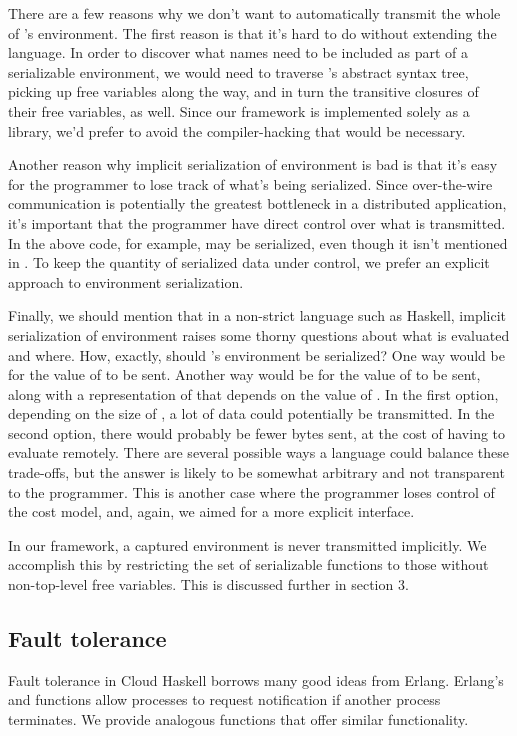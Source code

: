 \documentclass[preprint]{sigplanconf}
\begin{document}
There are a few reasons why we don't want to automatically transmit the whole of 's environment. The first reason is that it's hard to do without extending the language. In order to discover what names need to be included as part of a serializable environment, we would need to traverse 's abstract syntax tree, picking up free variables along the way, and in turn the transitive closures of their free variables, as well. Since our framework is implemented solely as a library, we'd prefer to avoid the compiler-hacking that would be necessary.

Another reason why implicit serialization of environment is bad is that it's easy for the programmer to lose track of what's being serialized. Since over-the-wire communication is potentially the greatest bottleneck in a distributed application, it's important that the programmer have direct control over what is transmitted. In the above code, for example,  may be serialized, even though it isn't mentioned in . To keep the quantity of serialized data under control, we prefer an explicit approach to environment serialization.

Finally, we should mention that in a non-strict language such as Haskell, implicit serialization of environment raises some thorny questions about what is evaluated and where. How, exactly, should 's environment be serialized? One way would be for the value of  to be sent. Another way would be for the value of  to be sent, along with a representation of  that depends on the value of . In the first option, depending on the size of , a lot of data could potentially be transmitted. In the second option, there would probably be fewer bytes sent, at the cost of having to evaluate  remotely. There are several possible ways a language could balance these trade-offs, but the answer is likely to be somewhat arbitrary and not transparent to the programmer. This is another case where the programmer loses control of the cost model, and, again, we aimed for a more explicit interface.

In our framework, a captured environment is never transmitted implicitly. We accomplish this by restricting the set of serializable functions to those without non-top-level free variables. This is discussed further in section 3.

\subsection{Fault tolerance}
\label{FaultTolerance}
Fault tolerance in Cloud Haskell borrows many good ideas from Erlang. Erlang's  and  functions allow processes to request notification if another process terminates. We provide analogous functions that offer similar functionality.
\end{document}
